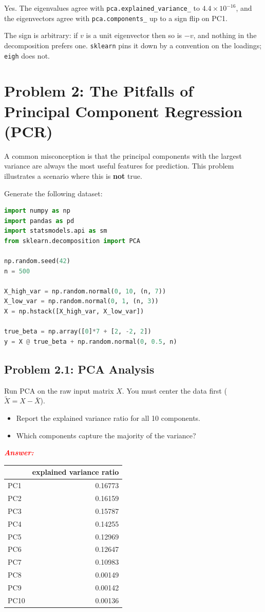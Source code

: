 \documentclass[11pt, letterpaper]{article}
\newcommand{\problem}[1]{\section*{Problem #1}}
\newcommand{\subproblem}[1]{\subsection*{Problem #1}}
\newcommand{\answer}{\textbf{\textit{\textcolor{red}{Answer:}}}}
\begin{document}
Yes. The eigenvalues agree with \texttt{pca.explained\_variance\_} to
$4.4 \times 10^{-16}$, and the eigenvectors agree with \texttt{pca.components\_} up to a sign flip
on PC1.

The sign is arbitrary: if $v$ is a unit eigenvector then so is $-v$, and nothing in the
decomposition prefers one. \texttt{sklearn} pins it down by a convention on the loadings;
\texttt{eigh} does not.


\problem{2: The Pitfalls of Principal Component Regression (PCR)}

A common misconception is that the principal components with the largest variance are always the most useful features for prediction. This problem illustrates a scenario where this is \textbf{not} true.

Generate the following dataset:

    \begin{lstlisting}[language=Python]
import numpy as np
import pandas as pd
import statsmodels.api as sm
from sklearn.decomposition import PCA

np.random.seed(42)
n = 500

X_high_var = np.random.normal(0, 10, (n, 7))
X_low_var = np.random.normal(0, 1, (n, 3))
X = np.hstack([X_high_var, X_low_var])

true_beta = np.array([0]*7 + [2, -2, 2])
y = X @ true_beta + np.random.normal(0, 0.5, n)\end{lstlisting}

\subproblem{2.1: PCA Analysis}
Run PCA on the raw input matrix $X$. You must center the data first ($\tilde{X} = X - \bar{X}$). 
\begin{itemize}
    \item Report the explained variance ratio for all 10 components.
    \item Which components capture the majority of the variance?
\end{itemize}

\answer

\begin{center}
\begin{tabular}{lr}
\toprule
 & explained variance ratio \\
\midrule
PC1 & 0.16773 \\
PC2 & 0.16159 \\
PC3 & 0.15787 \\
PC4 & 0.14255 \\
PC5 & 0.12969 \\
PC6 & 0.12647 \\
PC7 & 0.10983 \\
PC8 & 0.00149 \\
PC9 & 0.00142 \\
PC10 & 0.00136 \\
\bottomrule
\end{tabular}
\end{center}
\end{document}

